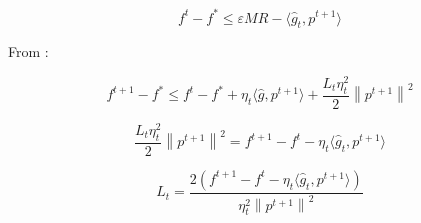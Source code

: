 \documentclass[runningheads, final]{llncs}
\newcommand{\norm}[1]{\left\lVert#1\right\rVert}
\newcommand{\vprod}[1]{\langle#1\rangle}
\newcommand{\errgrad}{\hat{g}}
\begin{document}
\begin{equation}
    f^t - f^* \leqslant \varepsilon M R - \vprod{\errgrad_t, p^{t + 1}}
\end{equation}

From \cite{hallak:2024}:

\begin{equation}\label{eq:descent_property_extracted}
    f^{t + 1} - f^* \leqslant f^t - f^* + \eta_t \vprod{\errgrad, p^{t + 1}}
    + \frac{L_t \eta_t^2}{2}\norm{p^{t + 1}}^2
\end{equation}

\begin{equation}
    \frac{L_t \eta_t^2}{2}\norm{p^{t + 1}}^2 = f^{t + 1} - f^t - \eta_t \vprod{\errgrad_t, p^{t + 1}}
\end{equation}

\begin{equation}
    L_t = \frac{2 (f^{t + 1} - f^t - \eta_t \vprod{\errgrad_t, p^{t + 1}})}
    {\eta_t^2 \norm{p^{t + 1}}^2}
\end{equation}
\end{document}
